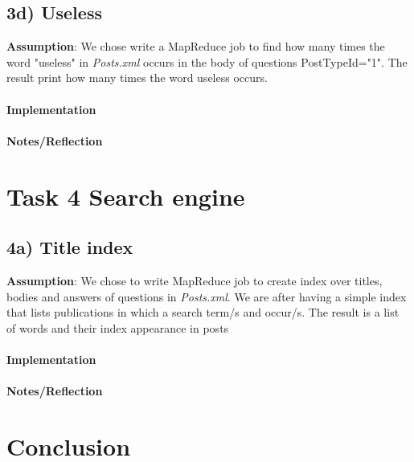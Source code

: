 \documentclass[fleqn,10pt]{wlscirep}
\begin{document}
\subsection*{3d) Useless}
\textbf{Assumption}:  We chose write a MapReduce job  to find how many times the word "useless" in \textit{Posts.xml} occurs in the body of questions PostTypeId="1". The result print how many times the word useless occurs.  \\ \\
\textbf{Implementation}  \\ \\
\textbf{Notes/Reflection}

\section*{Task 4 Search engine}
\subsection*{4a) Title index}
\textbf{Assumption}: We chose to write MapReduce job to create index over titles, bodies and answers of questions in \textit{Posts.xml}. We are after having a simple index that lists publications in which a search term/s and occur/s. The result is a list of words and their index appearance in posts \\ \\
\textbf{Implementation}  \\ \\
\textbf{Notes/Reflection}




\section*{Conclusion}
\end{document}
